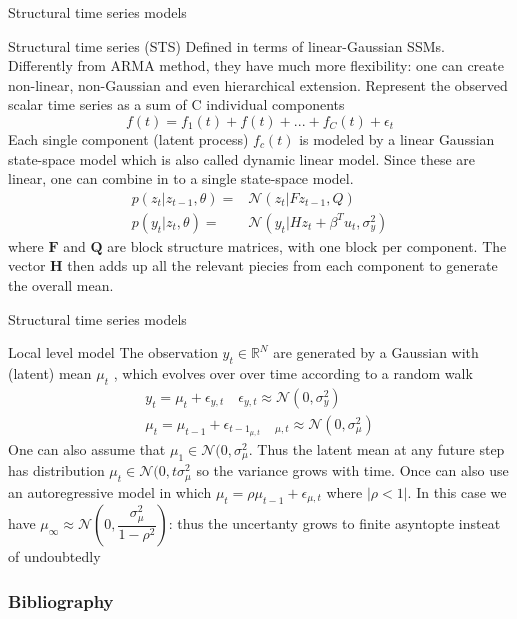 \documentclass[11pt]{beamer}
\begin{document}
\begin{frame}{Structural time series models \cite{pml2Book}}
\small
\begin{alertblock}{Structural time series (STS)}
Defined in terms of linear-Gaussian SSMs. Differently from ARMA method, they have much more flexibility: one can create non-linear, non-Gaussian and even hierarchical extension.
Represent the observed scalar time series as a sum of C individual components
\begin{equation*}
f(t)=f_{1}(t)+f(t)+...+f_{C}(t)+\epsilon_{t}
\end{equation*}
Each single component (latent process) $f_{c}(t)$ is modeled by a linear Gaussian state-space model which is also called dynamic linear model. Since these are linear, one can combine in to a single state-space model. 
\begin{equation*}
\begin{split}
p(z_{t}|z_{t-1},\theta)= & \mathcal{N}(z_{t}|Fz_{t-1},Q) \\
p(y_{t}|z_{t},\theta)= & \mathcal{N}(y_{t}|Hz_{t}+\beta^{T}u_{t},\sigma^{2}_{y})
\end{split}
\end{equation*}
where $\bm{F}$ and $\bm{Q}$ are block structure matrices, with one block per component. The vector $\bm{H}$ then adds up all the relevant piecies from each component to generate the overall mean. 
\end{alertblock}
\end{frame}

\begin{frame}{Structural time series models \cite{pml2Book}}
\small
\begin{exampleblock}{Local level model}
The observation $y_{t} \in  \mathbb{R}^{N}$ are generated by a Gaussian with (latent) mean $\mu_{t}$ , which evolves over over time according to a random walk 
\begin{equation*}
\begin{split}
y_{t}=\mu_{t}+\epsilon_{y,t} \quad \epsilon_{y,t}\approx \mathcal{N}(0,\sigma_{y}^{2}) \\
\mu_{t}=\mu_{t-1}+\epsilon_{t-1}_{\mu,t} \quad_{\mu,t} \approx  \mathcal{N}(0,\sigma_{\mu}^{2})
\end{split}
\end{equation*}
One can also assume that $\mu_{1} \in  \mathcal{N}(0,\sigma^{2}_{\mu}$. Thus the latent mean at any future step has distribution $\mu_{t} \in  \mathcal{N}(0,t\sigma^{2}_{\mu}$ so the variance grows with time. Once can also use an autoregressive model in which $\mu_{t}=\rho\mu_{t-1}+\epsilon_{\mu,t}$ where $|\rho<1|$. In this case we have $\mu_{\infty}\approx \mathcal{N}(0,\dfrac{\sigma^{2}_{\mu}}{1-\rho^{2}})$: thus the uncertanty grows to finite asyntopte insteat of undoubtedly
\end{exampleblock}
\end{frame}



\begin{frame}
\frametitle{Bibliography}
\printbibliography
\end{frame}
\end{document}
